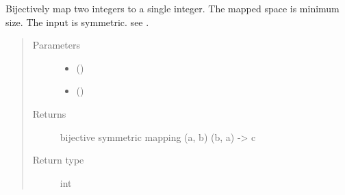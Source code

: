 \documentclass[a4paper,10pt,english,openany,oneside]{sphinxmanual}
\begin{document}
\begin{fulllineitems}
\label{\detokenize{reference/generated/paramagpy.fit.unique_pairing:paramagpy.fit.unique_pairing}}
Bijectively map two integers to a single integer.
The mapped space is minimum size.
The input is symmetric.
see .
\begin{quote}\begin{description}
\item[{Parameters}] \leavevmode\begin{itemize}
\item {} 
 () \textendash{} 

\item {} 
 () \textendash{} 

\end{itemize}

\item[{Returns}] \leavevmode
{} \textendash{} bijective symmetric mapping (a, b) \textbar{} (b, a) -\textgreater{} c

\item[{Return type}] \leavevmode
int

\end{description}\end{quote}

\end{fulllineitems}



\renewcommand{\indexname}{Python Module Index}
\begin{sphinxtheindex}
\let\bigletter\sphinxstyleindexlettergroup
\bigletter{p}
\item\relax{}
\item\relax{}
\item\relax{}
\item\relax{}
\end{sphinxtheindex}

\renewcommand{\indexname}{Index}
\printindex
\end{document}
